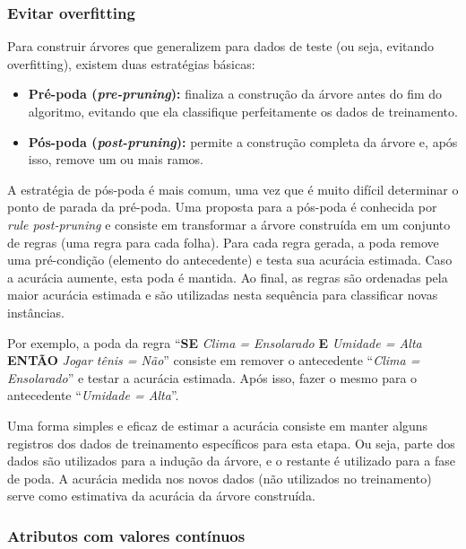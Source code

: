 \subsubsection{Evitar overfitting}

Para construir árvores que generalizem para dados de teste (ou seja, evitando overfitting), existem duas estratégias básicas:
\begin{itemize}
	\item \textbf{Pré-poda (\textit{pre-pruning}):} finaliza a construção da árvore antes do fim do algoritmo, evitando que ela classifique perfeitamente os dados de treinamento.
	\item \textbf{Pós-poda (\textit{post-pruning}):} permite a construção completa da árvore e, após isso, remove um ou mais ramos.
\end{itemize}

A estratégia de pós-poda é mais comum, uma vez que é muito difícil determinar o ponto de parada da pré-poda. Uma proposta para a pós-poda é conhecida por \textit{rule post-pruning} e consiste em transformar a árvore construída em um conjunto de regras (uma regra para cada folha). Para cada regra gerada, a poda remove uma pré-condição (elemento do antecedente) e testa sua acurácia estimada. Caso a acurácia aumente, esta poda é mantida. Ao final, as regras são ordenadas pela maior acurácia estimada e são utilizadas nesta sequência para classificar novas instâncias.

Por exemplo, a poda da regra ``\textbf{SE} \textit{Clima = Ensolarado} \textbf{E} \textit{Umidade = Alta} \textbf{ENTÃO} \textit{Jogar tênis = Não}'' consiste em remover o antecedente ``\textit{Clima = Ensolarado}'' e testar a acurácia estimada. Após isso, fazer o mesmo para o antecedente ``\textit{Umidade = Alta}''.

Uma forma simples e eficaz de estimar a acurácia consiste em manter alguns registros dos dados de treinamento específicos para esta etapa. Ou seja, parte dos dados são utilizados para a indução da árvore, e o restante é utilizado para a fase de poda. A acurácia medida nos novos dados (não utilizados no treinamento) serve como estimativa da acurácia da árvore construída.

\subsubsection{Atributos com valores contínuos}

